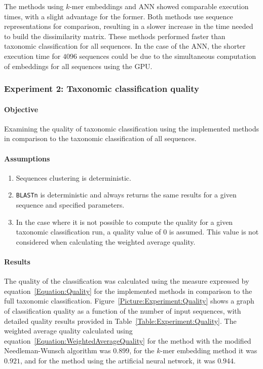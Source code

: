 \documentclass[pdflatex,sn-vancouver-num]{sn-jnl}%
\begin{document}
                The methods using $k$-mer embeddings and ANN showed comparable execution times, with a slight advantage for the former. Both methods use sequence representations for comparison, resulting in a slower increase in the time needed to build the dissimilarity matrix. These methods performed faster than taxonomic classification for all sequences. In the case of the ANN, the shorter execution time for $4096$ sequences could be due to the simultaneous computation of embeddings for all sequences using the GPU.

            \subsubsection{Experiment 2: Taxonomic classification quality}
                \paragraph{Objective}
                Examining the quality of taxonomic classification using the implemented methods in comparison to the taxonomic classification of all sequences.

                \paragraph{Assumptions}
                \begin{enumerate}
                    \item {
                        Sequences clustering is deterministic.
                    }
                    \item {
                        \texttt{BLASTn} is deterministic and always returns the same results for a given sequence and specified parameters.
                    }
                    \item {
                        In the case where it is not possible to compute the quality for a given taxonomic classification run, a quality value of $0$ is assumed. This value is not considered when calculating the weighted average quality.
                    }
                \end{enumerate}

                \paragraph{Results}
                The quality of the classification was calculated using the measure expressed by equation~\ref{Equation:Quality} for the implemented methods in comparison to the full taxonomic classification. Figure~\ref{Picture:Experiment:Quality} shows a graph of classification quality as a function of the number of input sequences, with detailed quality results provided in Table~\ref{Table:Experiment:Quality}. The weighted average quality calculated using equation~\ref{Equation:WeightedAverageQuality} for the method with the modified Needleman-Wunsch algorithm was $0.899$, for the $k$-mer embedding method it was $0.921$, and for the method using the artificial neural network, it was $0.944$.
\end{document}
